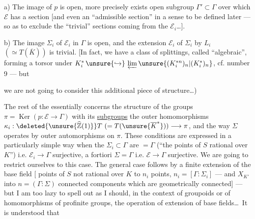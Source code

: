 a) The image \inserted{\(\Sigma\)} of \(p\) is open, more precisely exists
open subgroup \(\Gamma'\subset\Gamma\) over which
\(\mathcal E\) has a section [and even an ``admissible section'' in a sense to be
defined later --- so as to exclude the ``trivial'' sections coming
from the \(\mathcal E_i\)\ldots].

b) The image \(\Sigma_i\) of \(\mathcal E_i\) in \(\Gamma\) is open, and
the extension \(\mathcal E_i\) of \(\Sigma_i\) by \(L_i\)
\((\simeq T(\overline K))\) is trivial. [In fact, we have a
 class of splittings, called ``algebraic'', forming a
torsor under
\(K_i^*\,\unsure{\hookrightarrow}\,\varprojlim\unsure{(K_i^{*n})_n|(K_i^{*})_n}\),
cf. number 9 \unsure{]|?} --- but



we are not going to consider  this additional piece of
structure\ldots)


The rest of the  essentially concerns
the structure of the groups \(\pi=\operatorname{Ker}(p:\mathcal E\to\Gamma)\) with
its  \uline{subgroups}
 the outer homomorphisms
\(\kappa_i:\deleted{\unsure{\widehat{\mathbb Z}(1)}}T\ (=T(\unsure{\overline K^*}))\longrightarrow\pi\),
and the way \(\Sigma\) operates by outer automorphisms on \(\pi\).
These conditions are expressed in a particularly simple way when the
\(\Sigma_i\subset\Gamma\) are \(=\Gamma\)
(``the points of \(S\)  rational over \(K\)'') i.e.
\(\mathcal E_i\to\Gamma\) surjective, a fortiori \(\Sigma=\Gamma\) i.e.
\(\mathcal E\to\Gamma\) surjective. We are going to restrict ourselves to this case. The general case follows
by a finite extension of the base field
[  points of
\(S\) not rational over \(K\)
to \(n_i\) points, 
\(n_i=[\Gamma:\Sigma_i]\) \unsure{\(\}\)} --- and \(X_{K'}\)
  into \(n=(\Gamma:\Sigma)\) connected components
which are geometrically connected] --- but I am too lazy to spell out as I should,
in the context of groupoids or of  homomorphisms of profinite
groups, the operation of extension of base fields\ldots\ It is understood that

